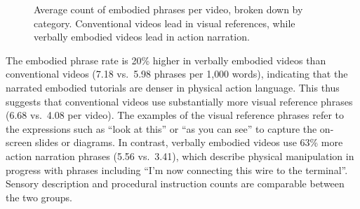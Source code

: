 \begin{figure}[h!]
    \centering
    \caption{Average count of embodied phrases per video, broken down by category. Conventional videos lead in visual references, while verbally embodied videos lead in action narration.}
    \label{fig:cat_breakdown}
\end{figure}

The embodied phrase rate is 20\% higher in verbally embodied videos than conventional videos (7.18 vs.\ 5.98 phrases per 1{,}000 words), indicating that the narrated embodied tutorials are denser in physical action language. This thus suggests that conventional videos use substantially more visual reference phrases (6.68 vs.\ 4.08 per video). The examples of the visual reference phrases refer to the  expressions such as ``look at this'' or ``as you can see'' to capture the on-screen slides or diagrams. In contrast, verbally embodied videos use 63\% more action narration phrases (5.56 vs.\ 3.41), which describe physical manipulation in progress with phrases including  ``I'm now connecting this wire to the terminal''. Sensory description and procedural instruction counts are comparable between the two groups.

